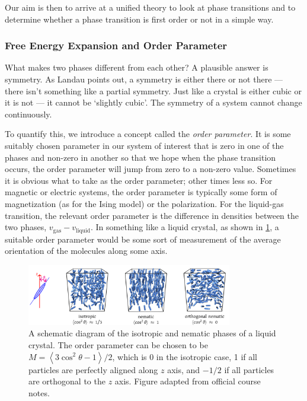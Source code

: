 \documentclass{article}
\theoremstyle{plain}\theoremheaderfont{\normalfont\bfseries}\theorembodyfont{\rmfamily}\theoremseparator{.}\newtheorem*{thm}{Theorem}\newtheorem*{law}{Law}\newtheorem*{pos}{Postulate}
\numberwithin{equation}{section}
\newcommand{\eval}[1]{\left\langle #1 \right\rangle}
\begin{document}
    Our aim is then to arrive at a unified theory to look at phase transitions and to determine whether a phase transition is first order or not in a simple way.
    \subsubsection{Free Energy Expansion and Order Parameter}
    What makes two phases different from each other? A plausible answer is symmetry. As Landau points out, a symmetry is either there or not there --- there isn't something like a partial symmetry. Just like a crystal is either cubic or it is not --- it cannot be `slightly cubic'. The symmetry of a system cannot change continuously.

    To quantify this, we introduce a concept called the \textit{order parameter}. It is some suitably chosen parameter in our system of interest that is zero in one of the phases and non-zero in another so that we hope when the phase transition occurs, the order parameter will jump from zero to a non-zero value. Sometimes it is obvious what to take as the order parameter; other times less so. For magnetic or electric systems, the order parameter is typically some form of magnetization (as for the Ising model) or the polarization. For the liquid-gas transition, the relevant order parameter is the difference in densities between the two phases, \(v_{\text{gas}}-v_{\text{liquid}}\). In something like a liquid crystal, as shown in \cref{liquid_crystal}, a suitable order parameter would be some sort of measurement of the average orientation of the molecules along some axis.

    \begin{figure}
        \centering
        \includegraphics[width=0.8\textwidth]{LC.png}
        \caption{A schematic diagram of the isotropic and nematic phases of a liquid crystal. The order parameter can be chosen to be \(M=\eval{3\cos^2\theta -1}/2\), which is 0 in the isotropic case, 1 if all particles are perfectly aligned along \(z\) axis, and \(-1/2\) if all particles are orthogonal to the \(z\) axis. Figure adapted from official course notes.}
        \label{liquid_crystal}
    \end{figure}
\end{document}
